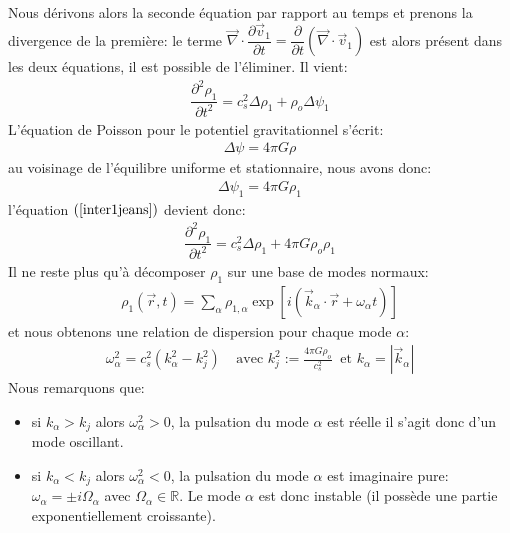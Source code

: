 Nous dérivons alors la seconde équation par rapport au temps et prenons la divergence de la première: le terme $\vec{\nabla}\cdot\dfrac
{\partial\vec{v}_{1}}{\partial t}=\dfrac{\partial}{\partial t}\left( \vec{\nabla}\cdot\vec{v}_{1}\right)$ est alors présent dans les deux équations,
il est possible de l'éliminer. Il vient:
\begin{align}
	\dfrac{\partial^{2}\rho_{1}}{\partial t^{2}}=c_{s}^{2}\Delta\rho_{1}+\rho_{o}\Delta\psi_{1}\label{inter1jeans}
\end{align}
L'équation de Poisson pour le potentiel gravitationnel s'écrit:
\begin{align*}
	\Delta\psi=4\pi G\rho
\end{align*}
au voisinage de l'équilibre uniforme et stationnaire, nous avons donc:
\begin{align*}
	\Delta\psi_{1}=4\pi G\rho_{1}%
\end{align*}
l'équation $\left(  \ref{inter1jeans}\right)  $ devient donc:
\begin{align*}
	\dfrac{\partial^{2}\rho_{1}}{\partial t^{2}}=c_{s}^{2}\Delta\rho_{1}+4\pi G\rho_{o}\rho_{1}
\end{align*}
Il ne reste plus qu'à décomposer $\rho_{1}$ sur une base de modes normaux:
\begin{align*}
	\rho_{1}\left(  \vec{r},t\right)  =\sum_{\alpha}\rho_{1,\alpha}\exp\left[i\left(  \vec{k}_{\alpha}\cdot\vec{r}+\omega_{\alpha}t\right)  \right]
\end{align*}
et nous obtenons une relation de dispersion pour chaque mode $\alpha$:
\begin{align*}
	\omega_{\alpha}^{2}=c_{s}^{2}\left(  k_{\alpha}^{2}-k_{j}^{2}\right)
	\ \ \ \ \ \text{avec }k_{j}^{2}:=\frac{4\pi G\rho_{o}}{c_{s}^{2}}\ \text{\ et
	\ }k_{\alpha}=\left\vert \vec{k}_{\alpha}\right\vert
\end{align*}
Nous remarquons que:
\begin{itemize}

	\item si $k_{\alpha}>k_{j}$ alors $\omega_{\alpha}^{2}>0$, la pulsation du mode $\alpha$ est réelle il s'agit donc d'un mode oscillant.

	\item si $k_{\alpha}<k_{j}$ alors $\omega_{\alpha}^{2}<0$, la pulsation du mode $\alpha$ est imaginaire pure: $\omega_{\alpha}=\pm
		i\Omega_{\alpha}$ avec $\Omega_{\alpha}\in\mathbb{R}$. Le mode $\alpha$ est donc instable (il possède une partie exponentiellement
		croissante).

\end{itemize}

